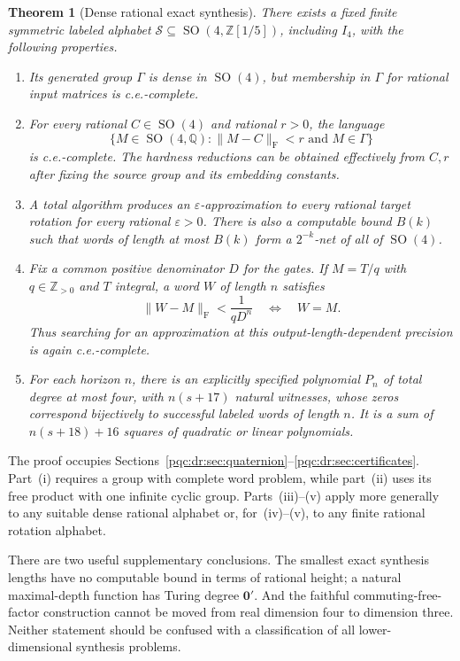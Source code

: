 \documentclass[11pt,letterpaper]{article}
\numberwithin{equation}{section}
\newtheorem{theorem}{Theorem}[section]
\theoremstyle{definition}
\theoremstyle{remark}
\newcommand{\Z}{\mathbb Z}
\newcommand{\Q}{\mathbb Q}
\newcommand{\Frob}[1]{\lVert #1\rVert_{\mathrm F}}
\newcommand{\SO}{\operatorname{SO}}
\begin{document}
\begin{theorem}[Dense rational exact synthesis]
\label{pqc:dr:thm:main}
There exists a fixed finite symmetric labeled alphabet
$\mathcal S\subseteq\SO(4,\Z[1/5])$, including $I_4$, with the following
properties.
\begin{enumerate}[label=\textup{(\roman*)}]
\item Its generated group $\Gamma$ is dense in $\SO(4)$, but membership in
$\Gamma$ for rational input matrices is c.e.-complete.
\item For every rational $C\in\SO(4)$ and rational $r>0$, the language
\[
 \{M\in\SO(4,\Q):\Frob{M-C}<r\text{ and }M\in\Gamma\}
\]
is c.e.-complete. The hardness reductions can be obtained effectively
from $C,r$ after fixing the source group and its embedding constants.
\item A total algorithm produces an $\varepsilon$-approximation to every
rational target rotation for every rational $\varepsilon>0$. There is also
a computable bound $B(k)$ such that words of length at most $B(k)$ form a
$2^{-k}$-net of all of $\SO(4)$.
\item Fix a common positive denominator $D$ for the gates. If $M=T/q$ with
$q\in\Z_{>0}$ and $T$ integral, a word $W$ of length $n$ satisfies
\[
 \Frob{W-M}<\frac1{qD^n}\quad\Longleftrightarrow\quad W=M.
\]
Thus searching for an approximation at this output-length-dependent
precision is again c.e.-complete.
\item For each horizon $n$, there is an explicitly specified polynomial
$P_n$ of total degree at most four, with $n(s+17)$ natural witnesses,
whose zeros correspond bijectively to successful labeled words of length
$n$. It is a sum of $n(s+18)+16$ squares of quadratic or linear polynomials.
\end{enumerate}
\end{theorem}

The proof occupies Sections~\ref{pqc:dr:sec:quaternion}--\ref{pqc:dr:sec:certificates}.
Part~(i) requires a group with complete word problem, while part~(ii)
uses its free product with one infinite cyclic group. Parts~(iii)--(v)
apply more generally to any suitable dense rational alphabet or,
for~(iv)--(v), to any finite rational rotation alphabet.

There are two useful supplementary conclusions. The smallest exact
synthesis lengths have no computable bound in terms of rational
height; a natural maximal-depth function has Turing degree $\mathbf0'$.
And the faithful commuting-free-factor construction cannot be moved
from real dimension four to dimension three. Neither statement should
be confused with a classification of all lower-dimensional synthesis
problems.
\end{document}

